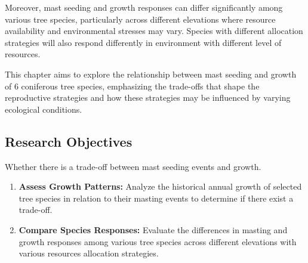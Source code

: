 \documentclass[11pt,letter]{article}
\begin{document}
Moreover, mast seeding and growth responses can differ significantly among various tree species, particularly across different elevations where resource availability and environmental stresses may vary. Species with different allocation strategies will also respond differently in environment with different level of resources. %

This chapter aims to explore the relationship between mast seeding and growth of 6 coniferous tree species, emphasizing the trade-offs that shape the reproductive strategies and how these strategies may be influenced by varying ecological conditions.
\subsection{Research Objectives}
Whether there is a trade-off between mast seeding events and growth. %
	\begin{enumerate}
	\item \textbf{Assess Growth Patterns:} Analyze the historical annual growth of selected tree species in relation to their masting events to determine if there exist a trade-off.
	\item \textbf{Compare Species Responses:} Evaluate the differences in masting and growth responses among various tree species across different elevations with various resources allocation strategies.
	\end{enumerate}
\end{document}
